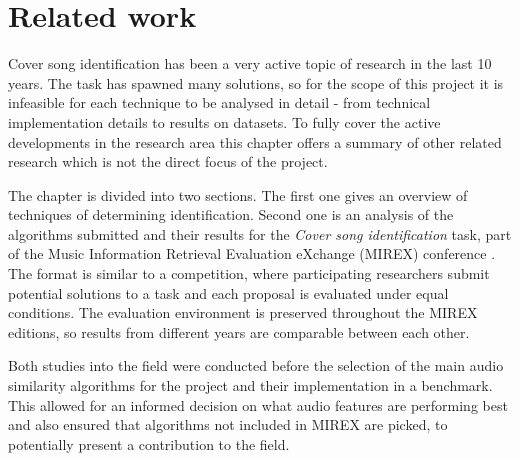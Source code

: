 
\chapter{Related work}
\label{chap:relatedwork}
\ifpdf
    \graphicspath{{RelatedWork/Figures/PNG/}{RelatedWork/Figures/PDF/}{RelatedTerminology/Figures/}}
\else
    \graphicspath{{RelatedWork/Figures/EPS/}{RelatedWork/Figures/}}
\fi




Cover song identification has been a very active topic of research in the last
10 years. The task has spawned many solutions, so for the scope of this project
it is infeasible for each technique to be analysed in detail - from technical
implementation details to results on datasets. To fully cover the active
developments in the research area this chapter offers a summary of other related
research which is not the direct focus of the project.

The chapter is divided into two sections. The first one gives an overview of
techniques of determining identification. Second one is an analysis of the
algorithms submitted and their results for the \textit{Cover song
identification} task, part of the Music Information Retrieval Evaluation
eXchange (MIREX) conference \cite{mirex}. The format is similar to a
competition, where participating researchers submit potential solutions to a
task and each proposal is evaluated under equal conditions. The evaluation
environment is preserved throughout the MIREX editions, so results from
different years are comparable between each other.

Both studies into the field were conducted before the selection of the main
audio similarity algorithms for the project and their implementation in a
benchmark. This allowed for an informed decision on what audio features are
performing best and also ensured that algorithms not included in MIREX are
picked, to potentially present a contribution to the field.


